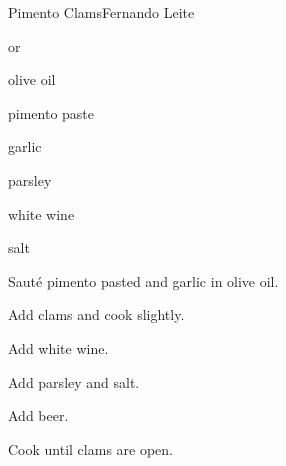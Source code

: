 \begin{recipe}{Pimento Clams}{Fernando Leite}{}

\begin{ingredients}
\item {} or 
\item olive oil
\item pimento paste
\item garlic
\item parsley
\item white wine
\item {}
\item salt
\end{ingredients}

\begin{directions}
\item Saut\'e pimento pasted and garlic in olive oil.
\item Add clams and cook slightly.
\item Add white wine.
\item Add parsley and salt.
\item Add beer.
\item Cook until clams are open.
\end{directions}

\end{recipe}
